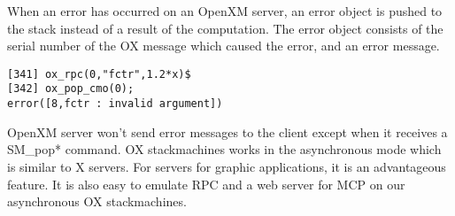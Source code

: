 When an error has occurred on an OpenXM server,
an error object is pushed to the stack instead of a result of the computation.
The error object consists of the serial number of the OX message
which caused the error, and an error message.
\begin{verbatim}
[341] ox_rpc(0,"fctr",1.2*x)$
[342] ox_pop_cmo(0);
error([8,fctr : invalid argument])
\end{verbatim}

OpenXM server won't send error messages to the client
except when it receives a SM\_pop* command.
OX stackmachines works in the asynchronous mode which is similar 
to X servers.
For servers for graphic applications, it is an advantageous feature.
It is also easy to emulate RPC and a web server for MCP \cite{iamc} 
on our asynchronous OX stackmachines.





